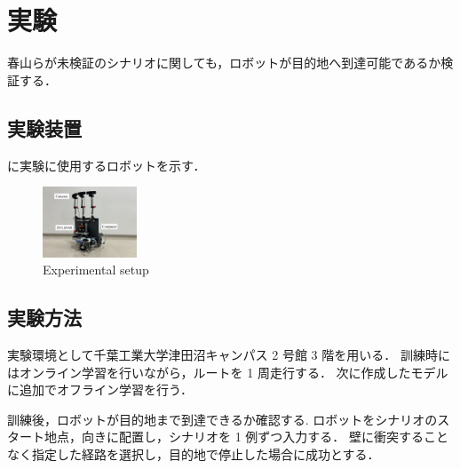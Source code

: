 \documentclass[10pt]{jarticle}
\begin{document}
    \section{実\hspace{2zw}験}%
    春山らが未検証のシナリオに関しても，ロボットが目的地へ到達可能であるか検証する．
    \subsection{実験装置}
    に実験に使用するロボットを示す．
    
    \begin{figure}[h]
        \centering
        \includegraphics[width=0.25\textwidth]{./fig/ishiguro/gamma.pdf}
        \vspace{-1zh}
        \caption{Experimental setup}
        \label{fig:gamma}
    \end{figure}
    
    \subsection{実験方法}
    実験環境として千葉工業大学津田沼キャンパス 2 号館 3 階を用いる．
    訓練時にはオンライン学習を行いながら，ルートを 1 周走行する．
    次に作成したモデルに追加でオフライン学習を行う．   

    訓練後，ロボットが目的地まで到達できるか確認する.
    ロボットをシナリオのスタート地点，向きに配置し，シナリオを 1 例ずつ入力する．
    壁に衝突することなく指定した経路を選択し，目的地で停止した場合に成功とする．
\end{document}

